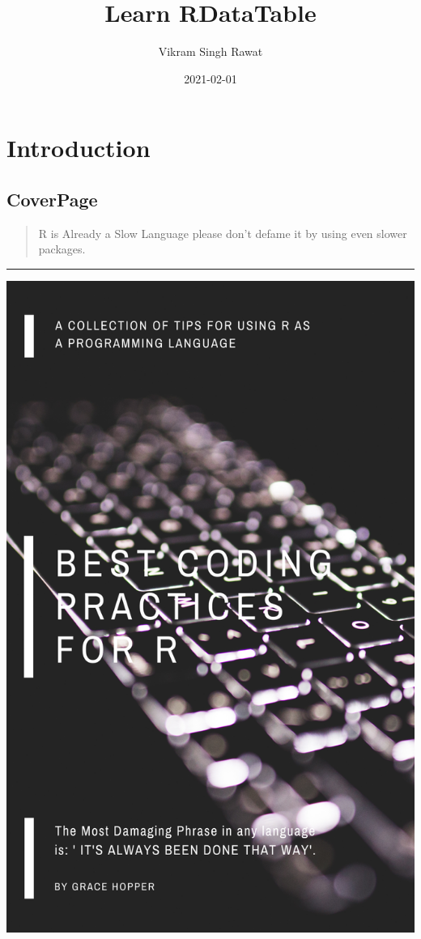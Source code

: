 \documentclass[
]{book}
\title{Learn RDataTable}
\author{Vikram Singh Rawat}
\date{2021-02-01}
\begin{document}
\maketitle

{
\setcounter{tocdepth}{1}
\tableofcontents
}
\hypertarget{part-introduction}{%
\part{Introduction}\label{part-introduction}}

\hypertarget{coverpage}{%
\chapter*{CoverPage}\label{coverpage}}

\begin{quote}
R is Already a Slow Language please don't defame it by using even slower packages.
\end{quote}

\begin{center}\rule{0.5\linewidth}{0.5pt}\end{center}

\includegraphics{figures/cover.png}
\end{document}
